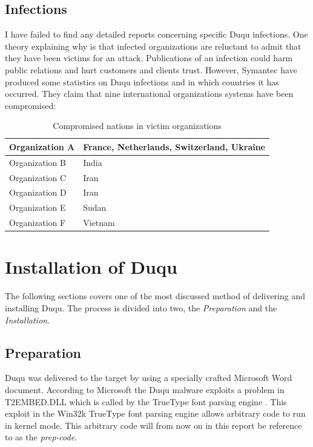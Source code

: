 \documentclass[11pt,english,a4paper]{report}
\begin{document}
\section{Infections}
I have failed to find any detailed reports concerning specific Duqu infections. One theory explaining why is that infected organizations are reluctant to admit that they have been victims for an attack. Publications of an infection could harm public relations and hurt customers and clients trust. However, Symantec have produced some statistics on Duqu infections and in which countries it has occurred. They claim that nine international organizations systems have been compromised:
\begin{table}[h]
        \caption{Compromised nations in victim organizations \cite{DUQU_SYMANTEC}}
        \begin{tabular}{|l|l|}
        \hline
        Organization A & France, Netherlands, Switzerland, Ukraine  \\ \hline
        Organization B & India  \\ \hline
        Organization C & Iran  \\ \hline
        Organization D & Iran  \\ \hline
        Organization E & Sudan  \\ \hline
        Organization F & Vietnam  \\ \hline
        \end{tabular}
      \end{table}

\chapter{Installation of Duqu}
The following sections covers one of the most discussed method of delivering and installing Duqu. The process is divided into two, the \textit{Preparation} and the \textit{Installation}.

\section{Preparation}
Duqu was delivered to the target by using a specially crafted Microsoft Word document. According to Microsoft the Duqu malware exploits a problem in T2EMBED.DLL which is called by the TrueType font parsing engine \cite{RYAN_ZDNET}. This exploit in the Win32k TrueType font parsing engine allows arbitrary code to run in kernel mode. This arbitrary code will from now on in this report be reference to as the \textit{prep-code}. 
\end{document}
